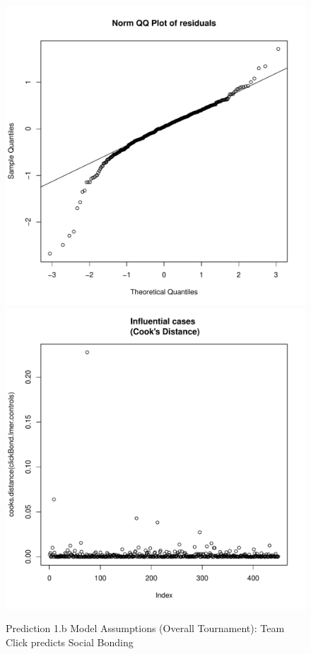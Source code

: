 \begin{CJK}{UTF8}{gbsn}
\begin{figure}[htbp]
              \includegraphics[scale =.4]{images/MLM31bQQNorm.pdf}
              \includegraphics[scale =.4]{images/MLM31bCooksD.pdf}
              \caption{Prediction 1.b Model Assumptions (Overall Tournament): Team Click predicts Social Bonding}
              \label{fig:MLM31bAssumptions}
            \end{figure}






\end{CJK}
